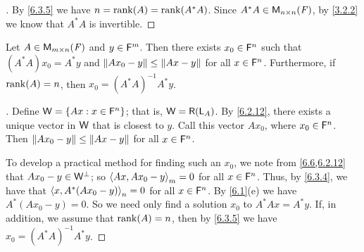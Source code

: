 \begin{proof}[]
  By \cref{6.3.5} we have \(n = \rk{A} = \rk{A^* A}\).
  Since \(A^* A \in \mathsf{M}_{{n} \times n}({\mathit{F}})\), by \cref{3.2.2} we know that \(A^* A\) is invertible.
\end{proof}

\begin{thm}\label{6.12}
  Let \(A \in \mathsf{M}_{{m} \times n}({\mathit{F}})\) and \(y \in \mathsf{F}^m\).
  Then there exists \(x_0 \in \mathsf{F}^n\) such that \((A^* A) x_0 = A^* y\) and \(\left\lVert A x_0 - y\right\rVert \leq \left\lVert Ax - y\right\rVert\) for all \(x \in \mathsf{F}^n\).
  Furthermore, if \(\rk{A} = n\), then \(x_0 = (A^* A)^{-1} A^* y\).
\end{thm}

\begin{proof}[]
  Define \(\mathsf{W} = \left\lbrace Ax : x \in \mathsf{F}^n\right\rbrace\);
  that is, \(\W = \rg{\L_A}\).
  By \cref{6.2.12}, there exists a unique vector in \(\mathsf{W}\) that is closest to \(y\).
  Call this vector \(A x_0\), where \(x_0 \in \mathsf{F}^n\).
  Then \(\left\lVert A x_0 - y\right\rVert \leq \left\lVert Ax - y\right\rVert\) for all \(x \in \mathsf{F}^n\).

  To develop a practical method for finding such an \(x_0\), we note from \cref{6.6,6.2.12} that \(A x_0 - y \in \mathsf{W}^{\perp}\);
  so \(\left\langle Ax, A x_0 - y\right\rangle_m = 0\) for all \(x \in \mathsf{F}^n\).
  Thus, by \cref{6.3.4}, we have that \(\left\langle x, A^* (A x_0 - y)\right\rangle_n = 0\) for all \(x \in \mathsf{F}^n\).
  By \cref{6.1}(e) we have \(A^* (A x_0 - y) = 0\).
  So we need only find a solution \(x_0\) to \(A^* Ax = A^* y\).
  If, in addition, we assume that \(\rk{A} = n\), then by \cref{6.3.5} we have \(x_0 = (A^* A)^{-1} A^* y\).
\end{proof}

